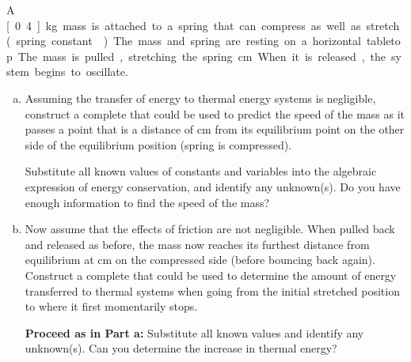 \label{fnt2.2.1-7}

A \unit[0.4]{kg} mass is attached to a spring that can compress as well as stretch (spring constant ). The mass and spring are resting on a horizontal tabletop. The mass is pulled, stretching the spring \unit[48]{cm}. When it is released, the system begins to oscillate.

\begin{enumerate}[(a)]
	\item\label{fnt2.2.1-7a} Assuming the transfer of energy to thermal energy systems is negligible, construct a complete \EnergyDiagram{} that could be used to predict the speed of the mass as it passes a point that is a distance of \unit[39]{cm} from its equilibrium point on the other side of the equilibrium position (spring is compressed).
	
		Substitute all known values of constants and variables into the algebraic expression of energy conservation, and identify any unknown(s). Do you have enough information to find the speed of the mass?
	
	\item\label{fnt2.2.1-7b} Now assume that the effects of friction are not negligible. When pulled back and released as before, the mass now reaches its furthest distance from equilibrium at \unit[40]{cm} on the compressed side (before bouncing back again). Construct a complete \EnergyDiagram{} that could be used to determine the amount of energy transferred to thermal systems when going from the initial stretched position to where it first momentarily stops.
	
		\textbf{Proceed as in Part a:} Substitute all known values and identify any unknown(s). Can you determine the increase in thermal energy?
\end{enumerate}